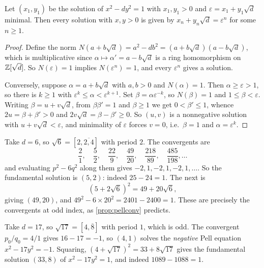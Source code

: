\documentclass[a4paper]{scrartcl}
\begin{document}
\begin{theorem}\label{thm:pellgroup}
	Let $(x_1, y_1)$ be the solution of $x^2 - dy^2 = 1$ with $x_1, y_1 > 0$ and $\varepsilon = x_1 + y_1\sqrt d$ minimal. Then every solution with $x, y > 0$ is given by $x_n + y_n\sqrt d = \varepsilon^n$ for some $n \geq 1$.
\end{theorem}
\begin{proof}
	Define the norm $N(a + b\sqrt d) = a^2 - db^2 = (a+b\sqrt d)(a - b\sqrt d)$, which is multiplicative since $\alpha \mapsto \alpha' = a - b\sqrt d$ is a ring homomorphism on $\mathbb{Z}[\sqrt d]$. So $N(\varepsilon) = 1$ implies $N(\varepsilon^n) = 1$, and every $\varepsilon^n$ gives a solution.

	Conversely, suppose $\alpha = a + b\sqrt d$ with $a, b > 0$ and $N(\alpha) = 1$. Then $\alpha \geq \varepsilon > 1$, so there is $k \geq 1$ with $\varepsilon^k \leq \alpha < \varepsilon^{k+1}$. Set $\beta = \alpha\varepsilon^{-k}$, so $N(\beta) = 1$ and $1 \leq \beta < \varepsilon$. Writing $\beta = u + v\sqrt d$, from $\beta\beta' = 1$ and $\beta \geq 1$ we get $0 < \beta' \leq 1$, whence $2u = \beta + \beta' > 0$ and $2v\sqrt d = \beta - \beta' \geq 0$. So $(u,v)$ is a nonnegative solution with $u + v\sqrt d < \varepsilon$, and minimality of $\varepsilon$ forces $v = 0$, i.e.\ $\beta = 1$ and $\alpha = \varepsilon^k$.
\end{proof}

\begin{example}
	Take $d = 6$, so $\sqrt6 = [2, \overline{2,4}]$ with period $2$. The convergents are
	$$
	\frac21, \quad \frac52, \quad \frac{22}9, \quad \frac{49}{20}, \quad \frac{218}{89}, \quad \frac{485}{198}, \dots
	$$
	and evaluating $p^2 - 6q^2$ along them gives $-2, 1, -2, 1, -2, 1, \dots$. So the fundamental solution is $(5, 2)$: indeed $25 - 24 = 1$. The next is
	$$
	(5 + 2\sqrt6)^2 = 49 + 20\sqrt6,
	$$
	giving $(49, 20)$, and $49^2 - 6\times20^2 = 2401 - 2400 = 1$. These are precisely the convergents at odd index, as \autoref{prop:pellconv} predicts.
\end{example}

\begin{example}
	Take $d = 17$, so $\sqrt{17} = [4, \overline 8]$ with period $1$, which is odd. The convergent $p_0/q_0 = 4/1$ gives $16 - 17 = -1$, so $(4,1)$ solves the \emph{negative} Pell equation $x^2 - 17y^2 = -1$. Squaring, $(4+\sqrt{17})^2 = 33 + 8\sqrt{17}$ gives the fundamental solution $(33, 8)$ of $x^2 - 17y^2 = 1$, and indeed $1089 - 1088 = 1$.
\end{example}
\end{document}
